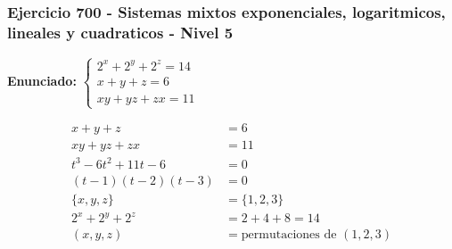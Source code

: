 \documentclass[12pt,a4paper]{article}
\begin{document}
\subsubsection*{Ejercicio 700 - Sistemas mixtos exponenciales, logaritmicos, lineales y cuadraticos - Nivel 5}
\textbf{Enunciado:} \(\begin{cases}2^x+2^y+2^z=14\\ x+y+z=6\\ xy+yz+zx=11\end{cases}\)

\[
\begin{aligned}
x+y+z&=6\\
xy+yz+zx&=11\\
t^3-6t^2+11t-6&=0\\
(t-1)(t-2)(t-3)&=0\\
\{x,y,z\}&=\{1,2,3\}\\
2^x+2^y+2^z&=2+4+8=14\\
(x,y,z)&=\boxed{\text{permutaciones de }(1,2,3)}
\end{aligned}
\]


\newpage
\end{document}
